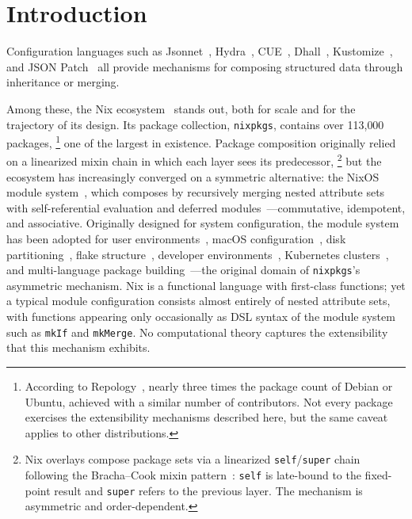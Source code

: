 \ifInheritanceBody
\section{Introduction}
\label{sec:introduction}

Configuration languages such as Jsonnet~\cite{jsonnet}, Hydra~\cite{hydra2023},
CUE~\cite{cue2019}, Dhall~\cite{dhall2017},
Kustomize~\cite{kustomize}, and JSON
Patch~\cite{rfc6902-json-patch} all provide mechanisms for
composing structured data through inheritance or merging.

Among these, the Nix ecosystem~\cite{dolstra2010-nixos} stands out,
both for scale and for the trajectory of its design.
Its package collection, \texttt{nixpkgs}, contains over
113{,}000 packages,%
\footnote{
  According to Repology~\cite{repology2025},
  nearly three times the package count of Debian or Ubuntu,
  achieved with a similar number of contributors.
  Not every package exercises the extensibility mechanisms
  described here, but the same caveat applies to other distributions.
}
one of the largest in existence.
Package composition originally relied on a linearized mixin
chain in which each layer sees its predecessor,%
\footnote{
  Nix overlays compose package sets via a linearized
  \texttt{self}/\texttt{super} chain following the
  Bracha--Cook mixin pattern~\cite{bracha1990-mixin-inheritance}:
  \texttt{self} is late-bound to the fixed-point result
  and \texttt{super} refers to the previous layer.
  The mechanism is asymmetric and order-dependent.
}
but the ecosystem has increasingly converged on a symmetric
alternative: the NixOS module
system~\cite{dolstra2010-nixos,nixosmodules}, which composes by
recursively merging nested attribute sets with self-referential
evaluation and deferred modules~\cite{nixosmodules}---commutative,
idempotent,
and associative.
Originally designed for system configuration, the module system
has been adopted for user environments~\cite{homemanager},
macOS configuration~\cite{nixdarwin},
disk partitioning~\cite{disko},
flake structure~\cite{flakeparts},
developer environments~\cite{devenv},
Kubernetes clusters~\cite{kubenix,nixidy},
and multi-language package building~\cite{dream2nix}---the
original domain of \texttt{nixpkgs}'s asymmetric mechanism.
Nix is a functional language with first-class functions;
yet a typical module configuration consists almost entirely of
nested attribute sets, with functions appearing only
occasionally as DSL syntax of the module system
such as \texttt{mkIf} and \texttt{mkMerge}.
No computational theory captures the extensibility that this
mechanism exhibits.

